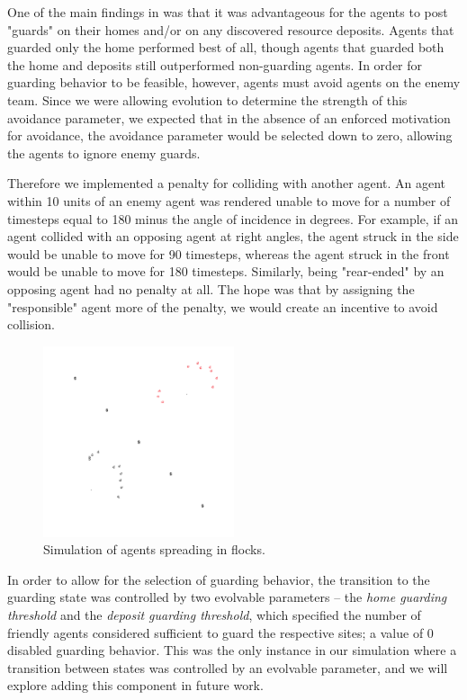 \documentclass[12pt,journal,compsoc]{IEEEtran}
\begin{document}
One of the main findings in \cite{rodriguez2004extending} was that it was advantageous for the agents to post "guards" on their homes and/or on any discovered resource deposits. Agents that guarded only the home performed best of all, though agents that guarded both the home and deposits still outperformed non-guarding agents. In order for guarding behavior to be feasible, however, agents must avoid agents on the enemy team. Since we were allowing evolution to determine the strength of this avoidance parameter, we expected that in the absence of an enforced motivation for avoidance, the avoidance parameter would be selected down to zero, allowing the agents to ignore enemy guards.

Therefore we implemented a penalty for colliding with another agent. An agent within 10 units of an enemy agent was rendered unable to move for a number of timesteps equal to 180 minus the angle of incidence in degrees. For example, if an agent collided with an opposing agent at right angles, the agent struck in the side would be unable to move for 90 timesteps, whereas the agent struck in the front would be unable to move for 180 timesteps. Similarly, being "rear-ended" by an opposing agent had no penalty at all. The hope was that by assigning the "responsible" agent more of the penalty, we would create an incentive to avoid collision.

\begin{figure}[h!]
    \centering
        \includegraphics[width=0.5\textwidth]{figures/simulation}
    \caption{Simulation of agents spreading in flocks.}
\end{figure}

In order to allow for the selection of guarding behavior, the transition to the guarding state was controlled by two  evolvable parameters -- the \textit{home guarding threshold} and the \textit{deposit guarding threshold}, which specified the number of friendly agents considered sufficient to guard the respective sites; a value of 0 disabled guarding behavior. This was the only instance in our simulation where a transition between states was controlled by an evolvable parameter, and we will explore adding this component in future work.
\end{document}
